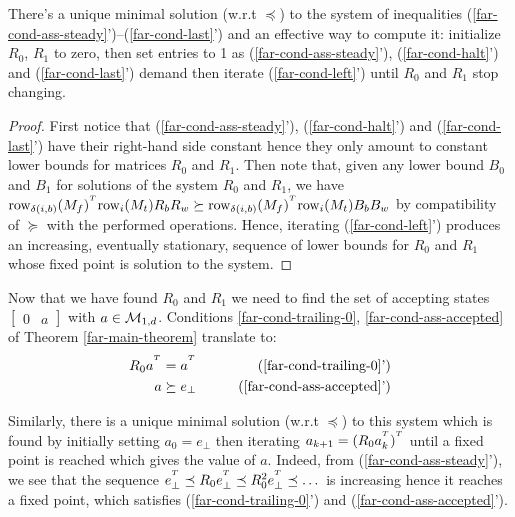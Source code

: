 \begin{lemma}\normalfont\label{lem:far-unique-min}
  There's a unique minimal solution (w.r.t $\preceq$) to the system  of inequalities (\ref{far-cond-ass-steady}')--(\ref{far-cond-last}') and an effective way to compute it: initialize $R_0$, $R_1$ to zero,
  then set entries to 1 as (\ref{far-cond-ass-steady}'), (\ref{far-cond-halt}') and (\ref{far-cond-last}') demand then iterate (\ref{far-cond-left}') until $R_0$ and $R_1$ stop changing.
\end{lemma}
\begin{proof}

  First notice that (\ref{far-cond-ass-steady}'), (\ref{far-cond-halt}') and (\ref{far-cond-last}') have their right-hand side constant hence they only amount to constant lower bounds for matrices $R_0$ and $R_1$. Then note that, given any lower bound $B_0$ and $B_1$ for solutions of the system $R_0$ and $R_1$, we have  $\text{row}_{\delta(i,b)}(M_f)^{^T} \text{row}_i(M_t)R_b R_w \succeq \text{row}_{\delta(i,b)}(M_f)^{^T} \text{row}_i(M_t)B_b B_w$ by compatibility of $\succeq$ with the performed operations. Hence, iterating (\ref{far-cond-left}') produces an increasing, eventually stationary, sequence of lower bounds for $R_0$ and $R_1$ whose fixed point is solution to the system.
\end{proof}


Now that we have found $R_0$ and $R_1$ we need to find the set of accepting states $\begin{bmatrix}0&a\end{bmatrix}$ with $a \in \mathcal{M}_{1,d}$.
Conditions \eqref{far-cond-trailing-0}, \eqref{far-cond-ass-accepted} of Theorem \ref{far-main-theorem}   translate to:
\begin{align}
  R_0 a^{\T} & = a^{\T}
             &
  \tag{\ref{far-cond-trailing-0}'}
  \\
  a          & \succeq e_{\bot}
             &
  \tag{\ref{far-cond-ass-accepted}'}
\end{align}

Similarly, there is a unique minimal solution (w.r.t $\preceq$) to this system which is found by initially setting $a_0 = e_\bot$ then iterating $a_{k+1} = (R_0 a_{k}^{^T})^{^T}$ until a fixed point is reached which gives the value of $a$. Indeed, from (\ref{far-cond-ass-steady}'), we see that the sequence $e_\bot^{^T} \preceq  R_0 e_\bot^{^T}\preceq R_0^2 e_\bot^{^T}  \preceq\dots$ is increasing hence it reaches a fixed point, which satisfies (\ref{far-cond-trailing-0}') and (\ref{far-cond-ass-accepted}').

